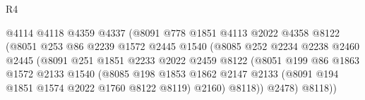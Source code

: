 \begin{lexlean}{R4}
\begin{coremodule}
                                        @4114
                                        @4118
                                        @4359
                                        @4337
                                        (@8091
                                          @778
                                          @1851
                                          @4113
                                          @2022
                                          @4358
                                          @8122
                                          (@8051
                                            @253
                                            @86
                                            @2239
                                            @1572
                                            @2445
                                            @1540
                                            (@8085
                                              @252
                                              @2234
                                              @2238
                                              @2460
                                              @2445
                                              (@8091
                                                @251
                                                @1851
                                                @2233
                                                @2022
                                                @2459
                                                @8122
                                                (@8051
                                                  @199
                                                  @86
                                                  @1863
                                                  @1572
                                                  @2133
                                                  @1540
                                                  (@8085
                                                    @198
                                                    @1853
                                                    @1862
                                                    @2147
                                                    @2133
                                                    (@8091 @194 @1851 @1574 @2022 @1760 @8122 @8119)
                                                    @2160)
                                                  @8118))
                                              @2478)
                                            @8118))

\end{coremodule}
\end{lexlean}
